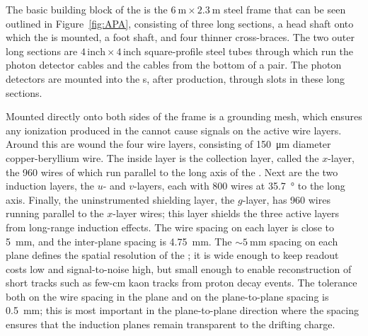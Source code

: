 The basic building block of the  is the $\SI{6}{\meter}\times\SI{2.3}{\meter}$ steel frame that can be seen outlined in Figure~\ref{fig:APA}, consisting of three long sections, a head shaft onto which the  is mounted, a foot shaft, and four thinner cross-braces. The two outer long sections are $4\,\mathrm{inch}\times 4\,\mathrm{inch}$ square-profile steel tubes through which run the photon detector cables and the  cables from the bottom  of a pair. The photon detectors are mounted into the s, after production, through slots in these long sections.

Mounted directly onto both sides of the  frame is a grounding mesh, which ensures any ionization produced in the  cannot cause signals on the active wire layers. Around this are wound the four wire layers, consisting of \SI{150}{\micro\meter} diameter copper-beryllium wire. The inside layer is the collection layer, called the $x$-layer, the 960 wires of which run parallel to the long axis of the . Next are the two induction layers, the $u$- and $v$-layers, each with 800 wires at \SI{35.7}{\degree} to the long axis. Finally, the uninstrumented shielding layer, the $g$-layer, has 960 wires running parallel to the $x$-layer wires; this layer shields the three active layers from long-range induction effects. The wire spacing on each layer is close to \SI{5}{\mm}, and the inter-plane spacing is \SI{4.75}{\mm}. The $\sim\!\SI{5}{\mm}$ spacing on each plane defines the spatial resolution of the ; it is wide enough to keep readout costs low and signal-to-noise high, but small enough to enable reconstruction of short tracks such as few-\si{\cm} kaon tracks from proton decay events. The tolerance both on the wire spacing in the plane and on the plane-to-plane spacing is \SI{0.5}{\mm}; this is most important in the plane-to-plane direction where the spacing ensures that the induction planes remain transparent to the drifting charge.

